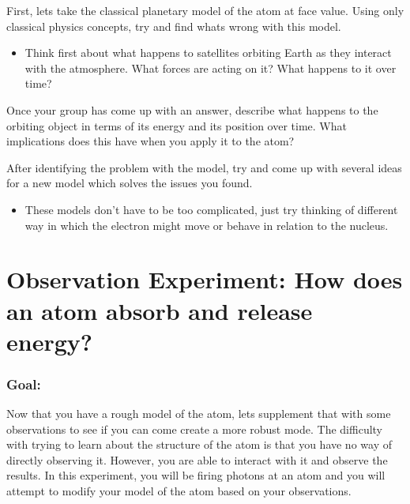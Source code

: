 

\begin{steps}
	\item First, lets take the classical planetary model of the atom at face value. Using only classical physics concepts, try and find whats wrong with this model. 
	\begin{itemize} 
		\item Think first about what happens to satellites orbiting Earth as they interact with the atmosphere. What forces are acting on it? What happens to it over time?
	\end{itemize}
	\item Once your group has come up with an answer, describe what happens to the orbiting object in terms of its energy and its position over time. What implications does this have when you apply it to the atom?
	
	\item After identifying the problem with the model, try and come up with several ideas for a new model which solves the issues you found.
	\begin{itemize}
		\item These models don't have to be too complicated, just try thinking of different way in which the electron might move or behave in relation to the nucleus.
	\end{itemize}
\end{steps}

\section{Observation Experiment: How does an atom absorb and release energy?}

\subsubsection{Goal:}
Now that you have a rough model of the atom, lets supplement that with some observations to see if you can come create a more robust mode. The difficulty with trying to learn about the structure of the atom is that you have no way of directly observing it. However, you are able to interact with it and observe the results. In this experiment, you will be firing photons at an atom and you will attempt to modify your model of the atom based on your observations.

